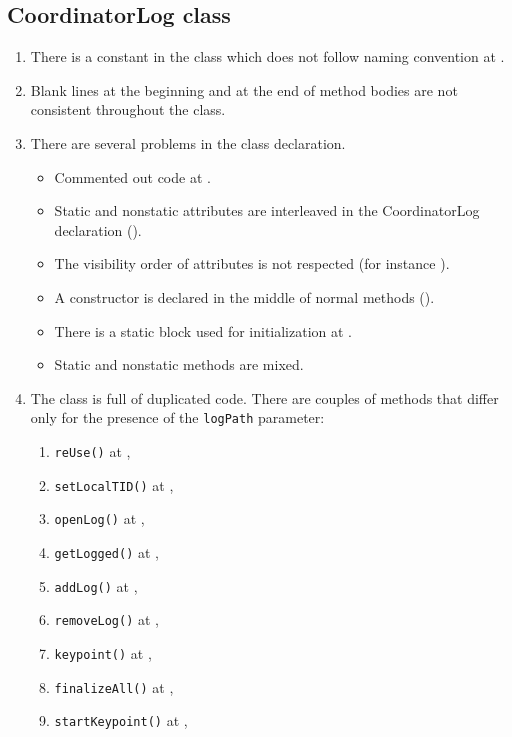 \subsection{CoordinatorLog class}
\label{sec:coordinatorlog-class}
\begin{enumerate}
	\item {} There is a constant in the class which does not follow naming convention at .
    \item {} Blank lines at the beginning and at the end of method bodies are not consistent throughout the class.
    \item {} There are several problems in the class declaration.
    \begin{itemize}
        \item  Commented out code at .
        \item Static and nonstatic attributes are interleaved in the CoordinatorLog declaration ().
        \item The visibility order of attributes is not respected (for instance ).
        \item A constructor is declared in the middle of normal methods ().
        \item There is a static block used for initialization at .
        \item Static and nonstatic methods are mixed.
    \end{itemize}

    \item {} The class is full of duplicated code. There are couples of methods that differ only for the presence of the \texttt{logPath} parameter:
    \begin{enumerate}
        \item \texttt{reUse()} at , 
    	\item \texttt{setLocalTID()} at , 
    	\item \texttt{openLog()} at , 
    	\item \texttt{getLogged()} at , 
    	\item \texttt{addLog()} at , 
    	\item \texttt{removeLog()} at , 
    	\item \texttt{keypoint()} at , 
    	\item \texttt{finalizeAll()} at , 
    	\item \texttt{startKeypoint()} at , 
    \end{enumerate}
\end{enumerate}
